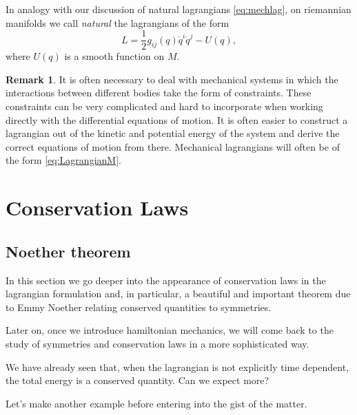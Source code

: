 \documentclass[english,fontsize=11pt,paper=b5]{scrbook}
\theoremstyle{definition}
\newtheorem{remark}{Remark}[chapter]
\begin{document}
    In analogy with our discussion of natural lagrangians \eqref{eq:mechlag}, on riemannian manifolds we call \emph{natural} the lagrangians of the form
    \begin{equation}\label{eq:LagrangianM}
      L = \frac 12 g_{ij}(q)\dot q^i \dot q^j - U(q),
    \end{equation}
    where $U(q)$ is a smooth function on $M$.

    \begin{remark}
      It  is  often  necessary  to  deal  with  mechanical  systems  in  which the interactions between different bodies take the form of constraints.
      These constraints can  be  very  complicated  and  hard  to  incorporate  when  working directly  with  the differential  equations  of  motion.
      It  is  often  easier  to  construct  a  lagrangian out of the kinetic and potential energy of the system and derive the correct equations of motion from there.
      Mechanical lagrangians will often be of the form \eqref{eq:LagrangianM}.
    \end{remark}


    \chapter{Conservation Laws}

    \section{Noether theorem}

    In this section we go deeper into the appearance of conservation laws in the lagrangian formulation and, in particular, a beautiful and important theorem due to Emmy Noether relating conserved quantities to symmetries.

    Later on, once we introduce hamiltonian mechanics, we will come back to the study of symmetries and conservation laws in a more sophisticated way.

    We have already seen that, when the lagrangian is not explicitly time dependent, the total energy is a conserved quantity.
    Can we expect more?

    Let's make another example before entering into the gist of the matter.
\end{document}
